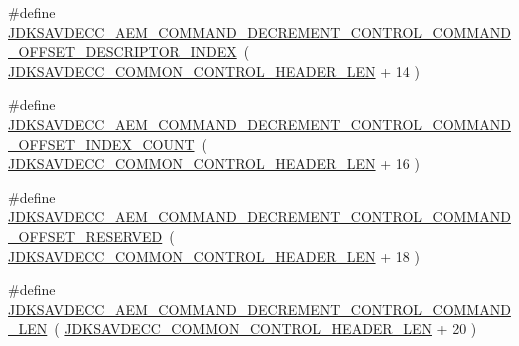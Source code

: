 \begin{DoxyCompactItemize}
\item 
\#define \hyperlink{group__command__decrement__control_ga85d8ef4551cff2138c445b2a7d4eb6aa}{J\+D\+K\+S\+A\+V\+D\+E\+C\+C\+\_\+\+A\+E\+M\+\_\+\+C\+O\+M\+M\+A\+N\+D\+\_\+\+D\+E\+C\+R\+E\+M\+E\+N\+T\+\_\+\+C\+O\+N\+T\+R\+O\+L\+\_\+\+C\+O\+M\+M\+A\+N\+D\+\_\+\+O\+F\+F\+S\+E\+T\+\_\+\+D\+E\+S\+C\+R\+I\+P\+T\+O\+R\+\_\+\+I\+N\+D\+EX}~( \hyperlink{group__jdksavdecc__avtp__common__control__header_gaae84052886fb1bb42f3bc5f85b741dff}{J\+D\+K\+S\+A\+V\+D\+E\+C\+C\+\_\+\+C\+O\+M\+M\+O\+N\+\_\+\+C\+O\+N\+T\+R\+O\+L\+\_\+\+H\+E\+A\+D\+E\+R\+\_\+\+L\+EN} + 14 )
\item 
\#define \hyperlink{group__command__decrement__control_gab1131e4fea0f8060944b47e8b03343eb}{J\+D\+K\+S\+A\+V\+D\+E\+C\+C\+\_\+\+A\+E\+M\+\_\+\+C\+O\+M\+M\+A\+N\+D\+\_\+\+D\+E\+C\+R\+E\+M\+E\+N\+T\+\_\+\+C\+O\+N\+T\+R\+O\+L\+\_\+\+C\+O\+M\+M\+A\+N\+D\+\_\+\+O\+F\+F\+S\+E\+T\+\_\+\+I\+N\+D\+E\+X\+\_\+\+C\+O\+U\+NT}~( \hyperlink{group__jdksavdecc__avtp__common__control__header_gaae84052886fb1bb42f3bc5f85b741dff}{J\+D\+K\+S\+A\+V\+D\+E\+C\+C\+\_\+\+C\+O\+M\+M\+O\+N\+\_\+\+C\+O\+N\+T\+R\+O\+L\+\_\+\+H\+E\+A\+D\+E\+R\+\_\+\+L\+EN} + 16 )
\item 
\#define \hyperlink{group__command__decrement__control_ga1bae1841b75ad4a13ce95cfda0163892}{J\+D\+K\+S\+A\+V\+D\+E\+C\+C\+\_\+\+A\+E\+M\+\_\+\+C\+O\+M\+M\+A\+N\+D\+\_\+\+D\+E\+C\+R\+E\+M\+E\+N\+T\+\_\+\+C\+O\+N\+T\+R\+O\+L\+\_\+\+C\+O\+M\+M\+A\+N\+D\+\_\+\+O\+F\+F\+S\+E\+T\+\_\+\+R\+E\+S\+E\+R\+V\+ED}~( \hyperlink{group__jdksavdecc__avtp__common__control__header_gaae84052886fb1bb42f3bc5f85b741dff}{J\+D\+K\+S\+A\+V\+D\+E\+C\+C\+\_\+\+C\+O\+M\+M\+O\+N\+\_\+\+C\+O\+N\+T\+R\+O\+L\+\_\+\+H\+E\+A\+D\+E\+R\+\_\+\+L\+EN} + 18 )
\item 
\#define \hyperlink{group__command__decrement__control_ga26da1b493aa5a66005f9532e291f59ce}{J\+D\+K\+S\+A\+V\+D\+E\+C\+C\+\_\+\+A\+E\+M\+\_\+\+C\+O\+M\+M\+A\+N\+D\+\_\+\+D\+E\+C\+R\+E\+M\+E\+N\+T\+\_\+\+C\+O\+N\+T\+R\+O\+L\+\_\+\+C\+O\+M\+M\+A\+N\+D\+\_\+\+L\+EN}~( \hyperlink{group__jdksavdecc__avtp__common__control__header_gaae84052886fb1bb42f3bc5f85b741dff}{J\+D\+K\+S\+A\+V\+D\+E\+C\+C\+\_\+\+C\+O\+M\+M\+O\+N\+\_\+\+C\+O\+N\+T\+R\+O\+L\+\_\+\+H\+E\+A\+D\+E\+R\+\_\+\+L\+EN} + 20 )
\end{DoxyCompactItemize}
